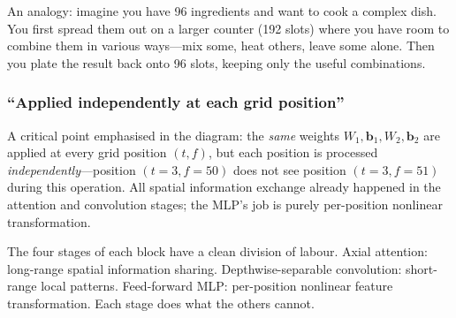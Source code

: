 \documentclass[11pt,a4paper]{article}
\begin{document}
	An analogy: imagine you have 96 ingredients and want to cook a complex dish.  You first spread them out on a larger counter (192 slots) where you have room to combine them in various ways---mix some, heat others, leave some alone.  Then you plate the result back onto 96 slots, keeping only the useful combinations.
	
	\subsubsection*{``Applied independently at each grid position''}
	
	A critical point emphasised in the diagram: the \emph{same} weights $W_1, \mathbf{b}_1, W_2, \mathbf{b}_2$ are applied at every grid position $(t,f)$, but each position is processed \emph{independently}---position $(t\!=\!3, f\!=\!50)$ does not see position $(t\!=\!3, f\!=\!51)$ during this operation.  All spatial information exchange already happened in the attention and convolution stages; the MLP's job is purely per-position nonlinear transformation.
	
	\begin{keyidea}
		The four stages of each block have a clean division of labour.  Axial attention: long-range spatial information sharing.  Depthwise-separable convolution: short-range local patterns.  Feed-forward MLP: per-position nonlinear feature transformation.  Each stage does what the others cannot.
	\end{keyidea}
	
	
	
\end{document}
